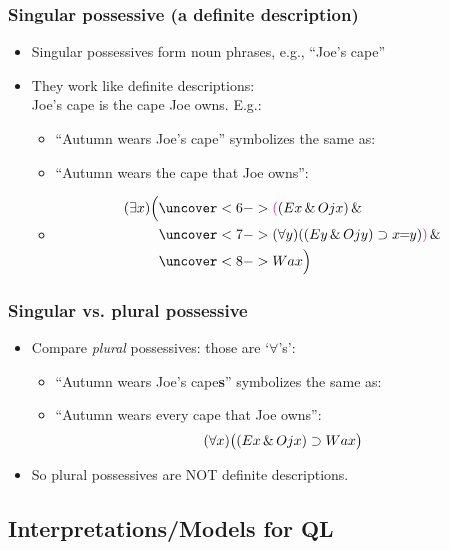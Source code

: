 \begin{frame}
  \frametitle{Singular possessive (a definite description)}

  \begin{itemize}[<+->]
    \item Singular possessives form noun phrases, e.g., ``Joe's cape''
    \item They work like definite descriptions: \\ Joe's cape is the cape Joe owns.
    E.g.:
    \begin{itemize}
      \item ``Autumn wears \alert{Joe's cape}'' symbolizes the same as:
      \item[] ``Autumn wears \alert{the cape that Joe owns}'':
      \item[]
      \begin{align*}
        \qt{\exists}{x}\Big(& \uncover<6->{\textcolor{OGlyallpink}{(}(E\qv{x} \land O\qr{j}{x}) \land {}}\\
        & \uncover<7->{\qt{\forall}{y}((E\qv{y} \land O\qr{j}{y}) \eif x\!\!=\!\!y)\textcolor{OGlyallpink}{)} \land {}}\\
        & \uncover<8->{W\qr{a}{x}\Big)}
      \end{align*}
    \end{itemize}
  \end{itemize}
\end{frame}

\begin{frame}
  \frametitle{Singular vs. plural possessive}

  \begin{itemize}[<+->]
    \item Compare \emph{plural} possessives: those are `$\forall$'s':
    \bigskip
    \begin{itemize}[<+->]
      \item ``Autumn wears \alert{Joe's cape\textbf{s}}'' symbolizes the same
      as:
      \item[] ``Autumn wears every cape that Joe owns'':
      \[(\forall x)\big((Ex \,\&\, Ojx) \supset Wax\big)\]
    \end{itemize}
    \item So plural possessives are NOT definite descriptions. 
  \end{itemize}
\end{frame}



\subsection{Interpretations/Models for QL}

